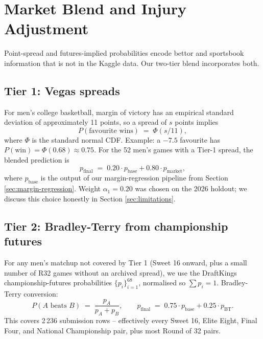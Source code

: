 \documentclass[11pt, a4paper]{article}
\begin{document}
\section{Market Blend and Injury Adjustment}
\label{sec:market}

Point-spread and futures-implied probabilities encode bettor and sportsbook information that is not in the Kaggle data. Our two-tier blend incorporates both.

\subsection{Tier 1: Vegas spreads}
\label{sec:tier1}

For men's college basketball, margin of victory has an empirical standard deviation of approximately 11 points, so a spread of $s$ points implies
\begin{equation}
    P(\text{favourite wins}) \;=\; \Phi(s / 11),
\end{equation}
where $\Phi$ is the standard normal CDF. Example: a $-7.5$ favourite has $P(\text{win}) = \Phi(0.68) \approx 0.75$. For the 52 men's games with a Tier-1 spread, the blended prediction is
\begin{equation}
    p_{\text{final}} \;=\; 0.20 \cdot p_{\text{base}} + 0.80 \cdot p_{\text{market}},
\end{equation}
where $p_{\text{base}}$ is the output of our margin-regression pipeline from Section \ref{sec:margin-regression}. Weight $\alpha_1 = 0.20$ was chosen on the 2026 holdout; we discuss this choice honestly in Section \ref{sec:limitations}.

\subsection{Tier 2: Bradley-Terry from championship futures}
\label{sec:tier2}

For any men's matchup not covered by Tier 1 (Sweet 16 onward, plus a small number of R32 games without an archived spread), we use the DraftKings championship-futures probabilities $\{p_i\}_{i=1}^{68}$, normalised so $\sum p_i = 1$. Bradley-Terry conversion:
\begin{equation}
    P(A \text{ beats } B) \;=\; \frac{p_A}{p_A + p_B}, \qquad p_{\text{final}} \;=\; 0.75 \cdot p_{\text{base}} + 0.25 \cdot p_{\text{BT}}.
\end{equation}
This covers 2\,236 submission rows -- effectively every Sweet 16, Elite Eight, Final Four, and National Championship pair, plus most Round of 32 pairs.
\end{document}
